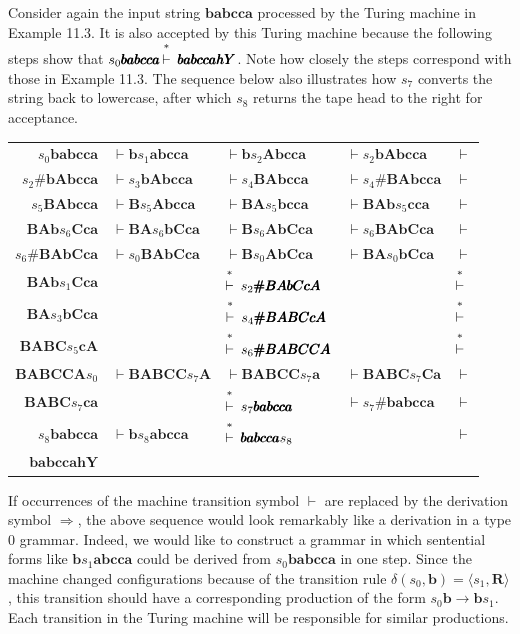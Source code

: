 Consider again the input string $\pmb{babcca}$ processed by the Turing machine
in Example 11.3. It is also accepted by this Turing machine because the
following steps show that $s_0\pmb{babcca}\Dvdash\pmb{babccahY}$. Note how
closely the steps correspond with those in Example 11.3. The sequence below also
illustrates how $s_7$ converts the string back to lowercase, after which $s_8$
returns the tape head to the right for acceptance.

\begin{center}\begin{tabular}{r@{ }l@{ }l@{ }l@{ }l@{ }}
$s_0\pmb{babcca}$ & $\vdash\pmb{b}s_1\pmb{abcca}$ & $\vdash\pmb{b}s_2\pmb{Abcca}$
	& $\vdash s_2\pmb{bAbcca}$ & $\vdash$ \\
$s_2\pmb{\#bAbcca}$ & $\vdash s_3\pmb{bAbcca}$ & $\vdash s_4\pmb{BAbcca}$ &
	$\vdash s_4\pmb{\#BAbcca}$ & $\vdash$ \\
$s_5\pmb{BAbcca}$ & $\vdash\pmb{B}s_5\pmb{Abcca}$ & $\vdash\pmb{BA}s_5
	\pmb{bcca}$ & $\vdash\pmb{BAb}s_5\pmb{cca}$ & $\vdash$ \\
$\pmb{BAb}s_6\pmb{Cca}$ & $\vdash\pmb{BA}s_6\pmb{bCca}$ & $\vdash\pmb{B}s_6
	\pmb{AbCca}$ & $\vdash s_6\pmb{BAbCca}$ & $\vdash$ \\
$s_6\pmb{\#BAbCca}$ & $\vdash s_0\pmb{BAbCca}$ &
$\vdash\pmb{B}s_0\pmb{AbCca}$ &
	$\vdash\pmb{BA}s_0\pmb{bCca}$ & $\vdash$ \\
$\pmb{BAb}s_1\pmb{Cca}$ && $\Dvdash s_2\pmb{\#BAbCcA}$ && $\Dvdash$ \\
$\pmb{BA}s_3\pmb{bCca}$ && $\Dvdash s_4\pmb{\#BABCcA}$ && $\Dvdash$ \\
$\pmb{BABC}s_5\pmb{cA}$ && $\Dvdash s_6\pmb{\#BABCCA}$ && $\Dvdash$ \\
$\pmb{BABCCA}s_0$ & $\vdash\pmb{BABCC}s_7\pmb{A}$ & $\vdash\pmb{BABCC}s_7
	\pmb{a}$ & $\vdash\pmb{BABC}s_7\pmb{Ca}$ & $\vdash$ \\
$\pmb{BABC}s_7\pmb{ca}$ && $\Dvdash s_7\pmb{babcca}$ & $\vdash
s_7\pmb{\#babcca}$
	& $\vdash$ \\
$s_8\pmb{babcca}$ & $\vdash\pmb{b}s_8\pmb{abcca}$ & $\Dvdash\pmb{babcca}s_8$
&&
	$\vdash$ \\
$\pmb{babccahY}$
\end{tabular}\end{center}

If occurrences of the machine transition symbol $\vdash$ are replaced by the
derivation symbol $\Rightarrow$, the above sequence would look remarkably like a
derivation in a type 0 grammar. Indeed, we would like to construct a grammar in
which sentential forms like $\pmb{b}s_1\pmb{abcca}$ could be derived from
$s_0\pmb{babcca}$ in one step. Since the machine changed configurations because
of the transition rule $\delta(s_0,\pmb{b})=\langle s_1,\pmb{R}\rangle$, this
transition should have a corresponding production of the form $s_0\pmb{b}
\rightarrow\pmb{b}s_1$. Each transition in the Turing machine will be
responsible for similar productions.

